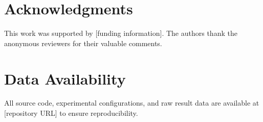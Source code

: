 \documentclass[twocolumn]{article}
\begin{document}














\section*{Acknowledgments}
This work was supported by [funding information]. The authors thank the
anonymous reviewers for their valuable comments.

\section*{Data Availability}
All source code, experimental configurations, and raw result data are
available at [repository URL] to ensure reproducibility.
\end{document}
